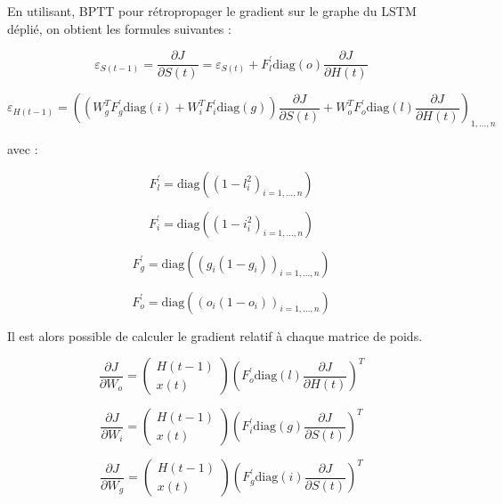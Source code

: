 \documentclass{report}
\theoremstyle{plain}
\theoremstyle{definition}
\theoremstyle{remark}
\begin{document}
En utilisant, BPTT pour rétropropager le gradient sur le graphe du LSTM déplié, on obtient les formules suivantes :

\begin{equation}
\varepsilon_{S(t-1)} = \frac{\partial J}{\partial S(t)} = \varepsilon_{S(t)} + F_{l}^{\prime}\text{diag}(o)\frac{\partial J}{\partial H(t)}
\end{equation}

\begin{equation}
\varepsilon_{H(t-1)} = \left((W_{g}^{T}F_{g}^{\prime}\text{diag}(i) + W_{i}^{T}F_{i}^{\prime}\text{diag}(g))\frac{\partial J}{\partial S(t)} + W_{o}^{T}F_{o}^{\prime}\text{diag}(l)\frac{\partial J}{\partial H(t)}\right)_{1,...,n}
\end{equation}

avec :

\[
F_{l}^{\prime} = \text{diag}((1 - l_{i}^{2})_{i=1,...,n})
\]

\[
F_{i}^{\prime} = \text{diag}((1 - i_{i}^{2})_{i=1,...,n})
\]

\[
F_{g}^{\prime} = \text{diag}((g_{i}(1 - g_{i}))_{i=1,...,n})
\]

\[
F_{o}^{\prime} = \text{diag}((o_{i}(1 - o_{i}))_{i=1,...,n})
\]


Il est alors possible de calculer le gradient relatif à chaque matrice de poids.

\begin{equation}
\frac{\partial J}{\partial W_{o}}=
\begin{pmatrix}
H(t-1) \\
x(t)
\end{pmatrix}
\left(F_{o}^{\prime}\text{diag}(l)\frac{\partial J}{\partial H(t)}\right)^{T}
\end{equation}

\begin{equation}
\frac{\partial J}{\partial W_{i}}=
\begin{pmatrix}
H(t-1) \\
x(t)
\end{pmatrix}
\left(F_{i}^{\prime}\text{diag}(g)\frac{\partial J}{\partial S(t)}\right)^{T}
\end{equation}

\begin{equation}
\frac{\partial J}{\partial W_{g}}=
\begin{pmatrix}
H(t-1) \\
x(t)
\end{pmatrix}
\left(F_{g}^{\prime}\text{diag}(i)\frac{\partial J}{\partial S(t)}\right)^{T}
\end{equation}
\end{document}
